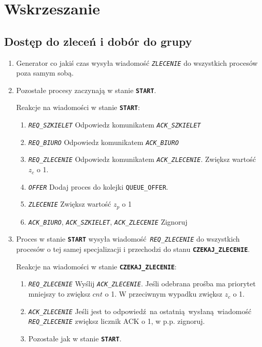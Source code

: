 \documentclass[12pt]{article}
\newcommand{\state}[1]{\texttt{\textbf{#1}}}
\newcommand{\msg}[1]{\texttt{\emph{#1}}}
\newcommand{\var}[1]{\texttt{#1}}
\begin{document}
\section{Wskrzeszanie}

\subsection{Dostęp do zleceń i dobór do grupy}
\begin{enumerate}
	\item Generator co jakiś czas wysyła wiadomość \msg{ZLECENIE} do wszystkich procesów poza samym sobą.
	
	\item Pozostałe procesy zaczynają w stanie \state{START}.
	
	Reakcje na wiadomości w stanie \state{START}:
	\begin{enumerate}
		\item \msg{REQ\_SZKIELET} Odpowiedz komunikatem \msg{ACK\_SZKIELET}
		\item \msg{REQ\_BIURO} Odpowiedz komunikatem \msg{ACK\_BIURO}
		\item \msg{REQ\_ZLECENIE} Odpowiedz komunikatem \msg{ACK\_ZLECENIE}. Zwiększ wartość $z_c$ o 1.
		\item \msg{OFFER} Dodaj proces do kolejki \var{QUEUE\_OFFER}.
		\item \msg{ZLECENIE} Zwiększ wartość $z_p$ o 1
		\item \msg{ACK\_BIURO}, \msg{ACK\_SZKIELET}, \msg{ACK\_ZLECENIE} Zignoruj
	\end{enumerate}
		
	\item Proces w stanie \state{START} wysyła wiadomość \msg{REQ\_ZLECENIE} do wszystkich procesów o tej samej specjalizacji i przechodzi do stanu \state{CZEKAJ\_ZLECENIE}.
	
	Reakcje na wiadomości w stanie \state{CZEKAJ\_ZLECENIE}:
	\begin{enumerate}
		\item \msg{REQ\_ZLECENIE} Wyślij \msg{ACK\_ZLECENIE}. Jeśli odebrana prośba ma priorytet mniejszy to zwiększ $cnt$ o 1. W przeciwnym wypadku zwiększ $z_c$ o 1.
		\item \msg{ACK\_ZLECENIE} Jeśli jest to odpowiedź na ostatnią wysłaną wiadomość \msg{REQ\_ZLECENIE} zwiększ licznik ACK o 1, w p.p. zignoruj.
		\item Pozostałe jak w stanie \state{START}.
	\end{enumerate}
		

\end{enumerate}
\end{document}
